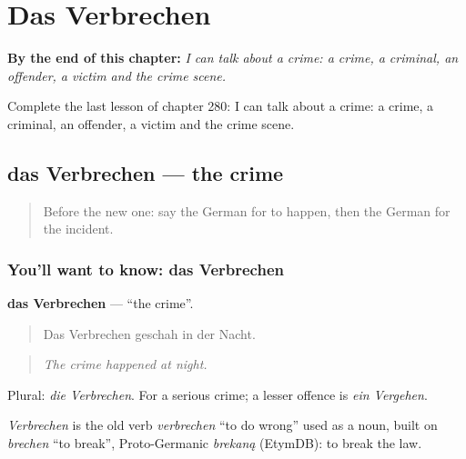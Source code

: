 
\chapter{Das Verbrechen}
\label{ch:ge-das-verbrechen}

\begin{chapteropening}
\textbf{By the end of this chapter:} \emph{I can talk about a crime: a crime, a criminal, an offender, a victim and the crime scene.}

Complete the last lesson of chapter 280: I can talk about a crime: a crime, a criminal, an offender, a victim and the crime scene.
\end{chapteropening}

\section[das Verbrechen]{das Verbrechen — the crime}

\label{lesson:GE-C280-verbrechen}



\begin{quote}
Before the new one: say the German for to happen, then the German for the incident.
\end{quote}

\subsection*{You'll want to know: das Verbrechen}
\textbf{das Verbrechen} — \textquotedblleft{}the crime\textquotedblright{}.

\begin{quote}
Das Verbrechen geschah in der Nacht.
\end{quote}

\begin{quote}
\emph{The crime happened at night.}
\end{quote}

Plural: \emph{die Verbrechen}. For a serious crime; a lesser offence is \emph{ein Vergehen}.

\begin{cousinweb}
\emph{Verbrechen} is the old verb \emph{verbrechen} \textquotedblleft{}to do wrong\textquotedblright{} used as a noun, built on \emph{brechen} \textquotedblleft{}to break\textquotedblright{}, Proto-Germanic \emph{brekaną} (EtymDB): to break the law.
\end{cousinweb}

